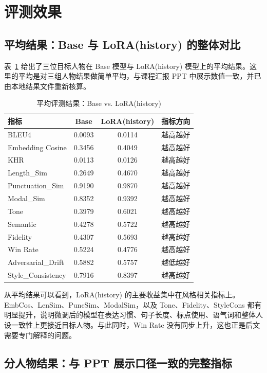 \documentclass[12pt,a4paper]{ctexart}
\begin{document}
\section{评测效果}

\subsection{平均结果：Base 与 LoRA(history) 的整体对比}

表~\ref{tab:macro-result} 给出了三位目标人物在 Base 模型与 LoRA(history) 模型上的平均结果。这里的平均是对三组人物结果做简单平均，与课程汇报 PPT 中展示数值一致，并已由本地结果文件重新核算。

\begin{table}[H]
\centering
\caption{平均评测结果：Base vs. LoRA(history)}
\label{tab:macro-result}
\begin{tabular}{lccc}
\toprule
指标 & Base & LoRA(history) & 指标方向 \\
\midrule
BLEU4 & 0.0093 & 0.0114 & 越高越好 \\
Embedding Cosine & 0.3456 & 0.4049 & 越高越好 \\
KHR & 0.0113 & 0.0126 & 越高越好 \\
Length\_Sim & 0.2649 & 0.4670 & 越高越好 \\
Punctuation\_Sim & 0.9190 & 0.9870 & 越高越好 \\
Modal\_Sim & 0.8352 & 0.9392 & 越高越好 \\
Tone & 0.3979 & 0.6021 & 越高越好 \\
Semantic & 0.4278 & 0.5722 & 越高越好 \\
Fidelity & 0.4307 & 0.5693 & 越高越好 \\
Win Rate & 0.5224 & 0.4776 & 越高越好 \\
Adversarial\_Drift & 0.5882 & 0.5757 & 越低越好 \\
Style\_Consistency & 0.7916 & 0.8397 & 越高越好 \\
\bottomrule
\end{tabular}
\end{table}

从平均结果可以看到，LoRA(history) 的主要收益集中在风格相关指标上。EmbCos、LenSim、PuncSim、ModalSim，以及 Tone、Fidelity、StyleCons 都有明显提升，说明微调后的模型在表达习惯、句子长度、标点使用、语气词和整体人设一致性上更接近目标人物。与此同时，Win Rate 没有同步上升，这也正是后文需要专门解释的问题。

\subsection{分人物结果：与 PPT 展示口径一致的完整指标}
\end{document}
